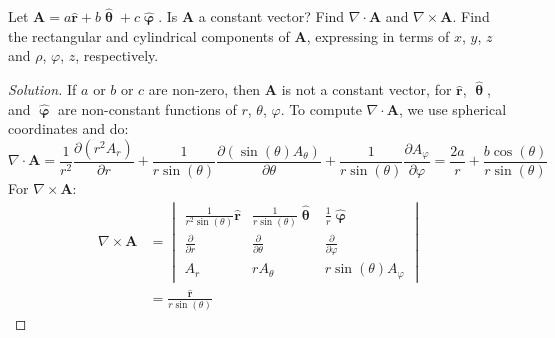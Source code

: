 \documentclass[crop=false,class=article,oneside]{standalone}
\begin{document}
        \begin{problem}[Wangsness 1-20]
            Let
            $\mathbf{A}%
             =a\hat{\mathbf{r}}%
             +b\hat{\boldsymbol{\uptheta}}%
             +c\hat{\boldsymbol{\upvarphi}}$.
            Is $\mathbf{A}$ a constant vector? Find
            $\nabla\cdot\mathbf{A}$ and
            $\nabla\times\mathbf{A}$. Find the rectangular
            and cylindrical components of $\mathbf{A}$,
            expressing in terms of $x$, $y$, $z$ and
            $\rho$, $\varphi$, $z$, respectively.
        \end{problem}
        \begin{proof}[Solution]
            If $a$ or $b$ or $c$ are non-zero,
            then $\mathbf{A}$ is not a constant
            vector, for $\hat{\mathbf{r}}$,
            $\hat{\boldsymbol{\uptheta}}$, and
            $\hat{\boldsymbol{\upvarphi}}$ are
            non-constant functions of
            $r$, $\theta$, $\varphi$.
            To compute $\nabla\cdot\mathbf{A}$,
            we use spherical coordinates and do:
            \begin{equation*}
                \nabla\cdot\mathbf{A}
                =\frac{1}{r^{2}}
                \frac{\partial(r^{2}A_{r})}{\partial{r}}
                +\frac{1}{r\sin(\theta)}
                \frac{\partial(\sin(\theta)A_{\theta})}
                     {\partial\theta}
                +\frac{1}{r\sin(\theta)}
                \frac{\partial A_{\varphi}}{\partial\varphi}
                =\frac{2a}{r}
                +\frac{b\cos(\theta)}{r\sin(\theta)}
            \end{equation*}
            For $\nabla\times\mathbf{A}$:
            \begin{align*}
                \nabla\times\mathbf{A}
                &=
                \begin{vmatrix}
                    \frac{1}{r^{2}\sin(\theta)}\hat{\mathbf{r}}
                    &\frac{1}{r\sin(\theta)}\hat{\boldsymbol{\uptheta}}
                    &\frac{1}{r}\hat{\boldsymbol{\upvarphi}}\\
                    \frac{\partial}{\partial{r}}
                    &\frac{\partial}{\partial\theta}
                    &\frac{\partial}{\partial\varphi}\\
                    A_{r}
                    &rA_{\theta}
                    &r\sin(\theta)A_{\varphi}
                \end{vmatrix}\\
                &=\frac{\hat{\mathbf{r}}}{r\sin(\theta)}

\end{align*}
\end{proof}
\end{document}
